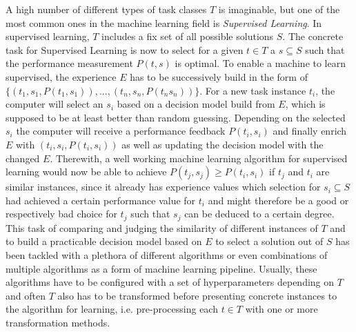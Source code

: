 A high number of different types of task classes $T$ is imaginable, but one of the most common ones in the machine learning field is \textit{Supervised Learning}.
In supervised learning, $T$ includes a fix set of all possible solutions $S$.
The concrete task for Supervised Learning is now to select for a given $t\in T$ a $s\subseteq S$ such that the performance measurement $P(t,s)$ is optimal.
To enable a machine to learn supervised, the experience $E$ has to be successively build in the form of $\{(t_1, s_1, P(t_1, s_1)), ..., (t_n, s_n, P(t_n s_n))\}$.\newline
For a new task instance $t_i$, the computer will select an $s_i$ based on a decision model build from $E$, which is supposed to be at least better than random guessing.
Depending on the selected $s_i$ the computer will receive a performance feedback $P(t_i, s_i)$ and finally enrich $E$ with $(t_i, s_i, P(t_i, s_i))$ as well as updating the decision model with the changed $E$.
Therewith, a well working machine learning algorithm for supervised learning would now be able to achieve $P(t_j, s_j) \geq P(t_i, s_i)$ if $t_j$ and $t_i$ are similar instances, since it already has experience values which selection for $s_i\subseteq S$ had achieved a certain performance value for $t_i$ and might therefore be a good or respectively bad choice for $t_j$ such that $s_j$ can be deduced to a certain degree.\newline
This task of comparing and judging the similarity of different instances of $T$ and to build a practicable decision model based on $E$ to select a solution out of $S$ has been tackled with a plethora of different algorithms or even combinations of multiple algorithms as a form of machine learning pipeline.
Usually, these algorithms have to be configured with a set of hyperparameters depending on $T$ and often $T$ also has to be transformed before presenting concrete instances to the algorithm for learning, i.e. pre-processing each $t\in T$ with one or more transformation methods.\newline

